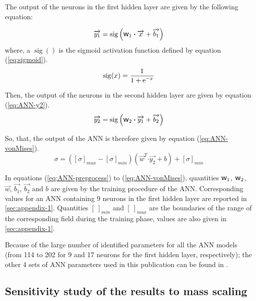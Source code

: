 \documentclass[final,5p,times,twocolumn]{elsarticle}
\newcommand{\e}[1]{\mbox{\ensuremath{\mathrm{e}^{#1}}}}
\DeclareMathOperator{\sigmoid}{sig}
\newcommand{\dotp}{\boldsymbol{\cdot}}
\newcommand{\w}{\mbox{\large\ensuremath{\mathsf{w}}}}
\begin{document}
The output of the neurons in the first hidden layer are given by the following equation:

\begin{equation}
\overrightarrow{y_1} = \sigmoid\left(\w_1 \dotp \overrightarrow{x}+ \overrightarrow{b_1}\right)\label{eq:ANN-y1}
\end{equation}
where, a $\sigmoid()$ is the sigmoid activation function defined by equation (\ref{eq:sigmoid}).
\begin{equation}
\sigmoid(x)=\frac{1}{1 + \e{-x}}\label{eq:sigmoid}
\end{equation}

Then, the output of the neurons in the second hidden layer are given by equation (\ref{eq:ANN-y2}).
\begin{equation}
\overrightarrow{y_2} = \sigmoid\left(\w_2 \dotp \overrightarrow{y_1}+ \overrightarrow{b_2}\right)\label{eq:ANN-y2}
\end{equation}

So, that, the output of the ANN is therefore given by equation (\ref{eq:ANN-vonMises}).
\begin{equation}
\sigma =  \left([\sigma]_{max}-[\sigma]_{min}\right) \left(\overrightarrow{w}^T \dotp \overrightarrow{y_2} + b\right) + [\sigma]_{min} \label{eq:ANN-vonMises}
\end{equation}

In equations (\ref{eq:ANN-preprocess}) to (\ref{eq:ANN-vonMises}), quantities $\w_1$, $\w_2$, $\overrightarrow{w}$, $\overrightarrow{b_1}$, $\overrightarrow{b_2}$ and $b$ are given by the training procedure of the ANN. Corresponding values for an ANN containing 9 neurons in the first hidden layer are reported in \ref{sec:appendix-1}. Quantities $[\ ]_{min}$ and $[\ ]_{max}$  are the boundaries of the range of the corresponding field during the training phase, values are also given in \ref{sec:appendix-1}.

Because of the large number of identified parameters for all the ANN models (from 114 to 202 for 9 and 17 neurons for the first hidden layer, respectively); the other 4 sets of ANN parameters used in this publication can be found in \cite{pantale_coefficients_2022}.










\subsection{Sensitivity study of the results to mass scaling}
\end{document}
